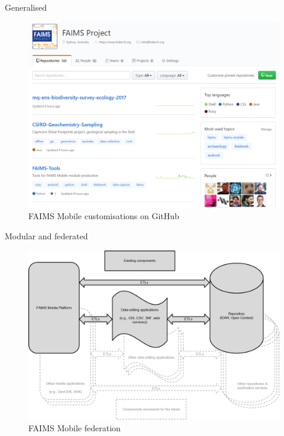 \documentclass[aspectratio=169, 12pt]{beamer} %
\begin{document}
\begin{frame}{Generalised}
 \begin{figure}[H]
    \centering
        \includegraphics[height=.75\textheight]{figures/FAIMS-generalised.png}
        \caption{FAIMS Mobile customisations on GitHub}
        \label{fig:FAIMS-github}
 \end{figure}
\end{frame}

\begin{frame}{Modular and federated}
 \begin{figure}[H]
    \centering
        \includegraphics[height=.75\textheight]{figures/FAIMS-federated.png}
        \caption{FAIMS Mobile federation}
        \label{fig:FAIMS-federation}
 \end{figure}
\end{frame}
\end{document}
